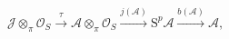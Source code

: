 \(\displaystyle
\mathcal J\otimes_{\pi}\mathcal O_S
  \xrightarrow{\tau}
\mathcal A\otimes_{\pi}\mathcal O_S
  \xrightarrow{j(\mathcal A)}
\mathrm S^p\mathcal A
  \xrightarrow{b(\mathcal A)}
\mathcal A ,
\)
